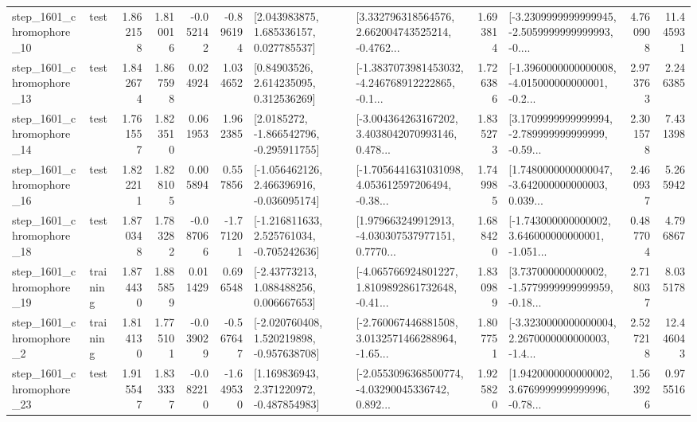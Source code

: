 \begin{tabular}{llrrrrllrlrr}
 step\_1601\_chromophore\_10 &      test &      1.862158 &    1.810016 &     -0.052142 & -0.896194 &     [2.043983875, 1.685336157, 0.027785537] &  [3.332796318564576, 2.662004743525214, -0.4762... &       1.693814 &  [-3.2309999999999945, -2.5059999999999993, -0.... &            4.760908 &         11.445931 \\
 step\_1601\_chromophore\_13 &      test &      1.842674 &    1.867598 &      0.024924 &  1.034652 &      [0.84903526, 2.614235095, 0.312536269] &  [-1.3837073981453032, -4.246768912222865, -0.1... &       1.726386 &  [-1.3960000000000008, -4.015000000000001, -0.2... &            2.973763 &          2.246385 \\
 step\_1601\_chromophore\_14 &      test &      1.761557 &    1.823510 &      0.061953 &  1.962385 &     [2.0185272, -1.866542796, -0.295911755] &  [-3.004364263167202, 3.4038042070993146, 0.478... &       1.835273 &  [3.1709999999999994, -2.789999999999999, -0.59... &            2.301578 &          7.431398 \\
 step\_1601\_chromophore\_16 &      test &      1.822211 &    1.828105 &      0.005894 &  0.557856 &   [-1.056462126, 2.466396916, -0.036095174] &  [-1.7056441631031098, 4.053612597206494, -0.38... &       1.749985 &  [1.7480000000000047, -3.642000000000003, 0.039... &            2.460937 &          5.265942 \\
 step\_1601\_chromophore\_18 &      test &      1.870348 &    1.783282 &     -0.087066 & -1.771201 &   [-1.216811633, 2.525761034, -0.705242636] &  [1.979663249912913, -4.030307537977151, 0.7770... &       1.688420 &  [-1.743000000000002, 3.646000000000001, -1.051... &            0.487704 &          4.796867 \\
 step\_1601\_chromophore\_19 &  training &      1.874430 &    1.885859 &      0.011429 &  0.696548 &     [-2.43773213, 1.088488256, 0.006667653] &  [-4.065766924801227, 1.8109892861732648, -0.41... &       1.830989 &  [3.737000000000002, -1.5779999999999959, -0.18... &            2.718037 &          8.035178 \\
  step\_1601\_chromophore\_2 &  training &      1.814130 &    1.775101 &     -0.039029 & -0.567647 &   [-2.020760408, 1.520219898, -0.957638708] &  [-2.760067446881508, 3.0132571466288964, -1.65... &       1.807751 &  [-3.3230000000000004, 2.2670000000000003, -1.4... &            2.527218 &         12.446043 \\
 step\_1601\_chromophore\_23 &      test &      1.915547 &    1.833337 &     -0.082210 & -1.649530 &    [1.169836943, 2.371220972, -0.487854983] &  [-2.0553096368500774, -4.03290045336742, 0.892... &       1.925820 &  [1.9420000000000002, 3.6769999999999996, -0.78... &            1.563926 &          0.975516 \\

\end{tabular}

